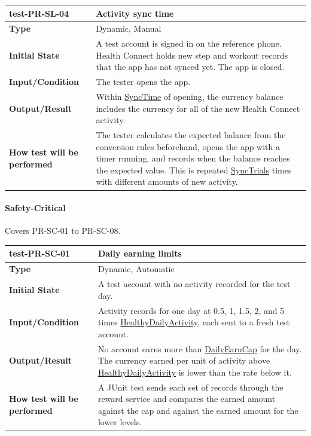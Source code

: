 \documentclass[12pt, titlepage]{article}
\newcommand{\const}[1]{\hyperlink{const:#1}{\textsf{#1}}}
\begin{document}
\vspace{1em}

\noindent\begin{tabularx}{\textwidth}{>{\raggedright\arraybackslash}p{3.5cm}X}
  \toprule
  \textbf{test-PR-SL-04} & \textbf{Activity sync time}\\
  \midrule
  \textbf{Type} & Dynamic, Manual\\
  \textbf{Initial State} & A test account is signed in on the reference phone. Health Connect holds new step and workout records that the app has not synced yet. The app is closed.\\
  \textbf{Input/Condition} & The tester opens the app.\\
  \textbf{Output/Result} & Within \const{SyncTime} of opening, the currency balance includes the currency for all of the new Health Connect activity.\\
  \textbf{How test will be performed} & The tester calculates the expected balance from the conversion rules beforehand, opens the app with a timer running, and records when the balance reaches the expected value. This is repeated \const{SyncTrials} times with different amounts of new activity.\\
  \bottomrule
\end{tabularx}

\paragraph{Safety-Critical}

Covers PR-SC-01 to PR-SC-08.

\noindent\begin{tabularx}{\textwidth}{>{\raggedright\arraybackslash}p{3.5cm}X}
  \toprule
  \textbf{test-PR-SC-01} & \textbf{Daily earning limits}\\
  \midrule
  \textbf{Type} & Dynamic, Automatic\\
  \textbf{Initial State} & A test account with no activity recorded for the test day.\\
  \textbf{Input/Condition} & Activity records for one day at 0.5, 1, 1.5, 2, and 5 times \const{HealthyDailyActivity}, each sent to a fresh test account.\\
  \textbf{Output/Result} & No account earns more than \const{DailyEarnCap} for the day. The currency earned per unit of activity above \const{HealthyDailyActivity} is lower than the rate below it.\\
  \textbf{How test will be performed} & A JUnit test sends each set of records through the reward service and compares the earned amount against the cap and against the earned amount for the lower levels.\\
  \bottomrule
\end{tabularx}
\end{document}
